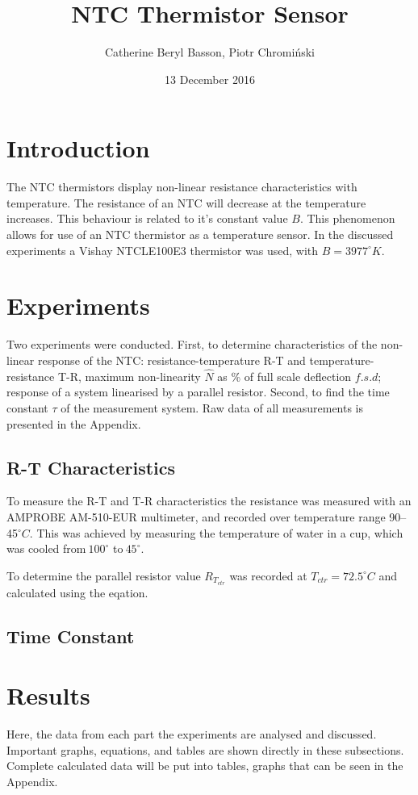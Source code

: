 \documentclass[a4,11pt]{article}
\begin{document}
\title{NTC Thermistor Sensor}
\author{Catherine Beryl Basson, Piotr Chromi\'nski}
\date{13 December 2016}
\maketitle
\twocolumn
\section{Introduction}

The NTC thermistors display non-linear resistance characteristics with temperature. The resistance of an NTC will decrease at the temperature increases. This behaviour is related to it's constant value $B$. This phenomenon allows for use of an NTC thermistor as a temperature sensor. In the discussed experiments a Vishay NTCLE100E3 thermistor was used, with $B=3977^{\circ}K$.

\section{Experiments}
Two experiments were conducted. First, to determine characteristics of the non-linear response of the NTC: resistance-temperature R-T and temperature-resistance T-R, maximum non-linearity $\hat N$ as \% of full scale deflection $f.s.d$; response of a system linearised by a parallel resistor. Second, to find the time constant $\tau$ of the measurement system. Raw data of all measurements is presented in the Appendix.
\subsection{R-T Characteristics}

To measure the R-T and T-R characteristics the resistance was measured with an AMPROBE AM-510-EUR multimeter, and recorded over temperature range 90--45$^{\circ}C$. This was achieved by measuring the temperature of water in a cup, which was cooled from$~100^{\circ}$ to$~45^{\circ}$.

To determine the parallel resistor value $R_{T_{ctr}}$ was recorded at $T_{ctr}=72.5^{\circ}C$ and calculated using the eqation.
\subsection{Time Constant}
\section{Results}
Here, the data from each part the experiments are analysed and discussed. Important graphs, equations, and tables are shown directly in these subsections. Complete calculated data will be put into tables, graphs that can be seen in the Appendix.
\end{document}
